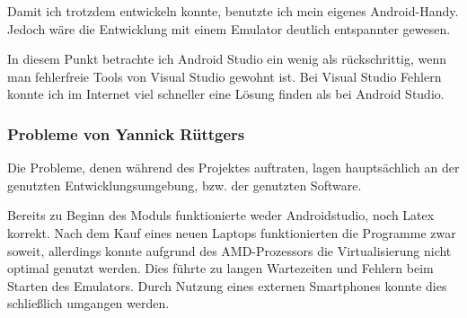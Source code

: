 Damit ich trotzdem entwickeln konnte, benutzte ich mein eigenes Android-Handy. Jedoch wäre die Entwicklung mit einem Emulator deutlich entspannter gewesen.

In diesem Punkt betrachte ich Android Studio ein wenig als rückschrittig, wenn man fehlerfreie Tools von Visual Studio gewohnt ist. Bei Visual Studio Fehlern konnte ich im Internet viel schneller eine Lösung finden als bei Android Studio.

\subsubsection{Probleme von Yannick Rüttgers}

Die Probleme, denen während des Projektes auftraten, lagen hauptsächlich an der genutzten Entwicklungsumgebung, bzw. der genutzten Software.

Bereits zu Beginn des Moduls funktionierte weder Androidstudio, noch Latex korrekt. Nach dem Kauf eines neuen Laptops funktionierten die Programme zwar soweit, allerdings konnte aufgrund des AMD-Prozessors die Virtualisierung nicht optimal genutzt werden. Dies führte zu langen Wartezeiten und Fehlern beim Starten des Emulators. Durch Nutzung eines externen Smartphones konnte dies schließlich umgangen werden.



